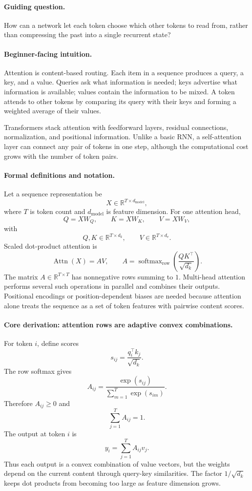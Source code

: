 \paragraph{Guiding question.}
How can a network let each token choose which other tokens to read from, rather than compressing the past into a single recurrent state?

\paragraph{Beginner-facing intuition.}
Attention is content-based routing. Each item in a sequence produces a query, a key, and a value. Queries ask what information is needed; keys advertise what information is available; values contain the information to be mixed. A token attends to other tokens by comparing its query with their keys and forming a weighted average of their values.

Transformers stack attention with feedforward layers, residual connections, normalization, and positional information. Unlike a basic RNN, a self-attention layer can connect any pair of tokens in one step, although the computational cost grows with the number of token pairs.

\paragraph{Formal definitions and notation.}
Let a sequence representation be
\[
X\in\mathbb{R}^{T\times d_{\mathrm{model}}},
\]
where \(T\) is token count and \(d_{\mathrm{model}}\) is feature dimension. For one attention head,
\[
Q=XW_Q,\qquad K=XW_K,\qquad V=XW_V,
\]
with
\[
Q,K\in\mathbb{R}^{T\times d_k},\qquad V\in\mathbb{R}^{T\times d_v}.
\]
Scaled dot-product attention is
\[
\boxed{
\operatorname{Attn}(X)
=A V,\qquad
A=\operatorname{softmax}_{\mathrm{row}}\left(\frac{QK^\top}{\sqrt{d_k}}\right).
}
\]
The matrix \(A\in\mathbb{R}^{T\times T}\) has nonnegative rows summing to \(1\). Multi-head attention performs several such operations in parallel and combines their outputs. Positional encodings or position-dependent biases are needed because attention alone treats the sequence as a set of token features with pairwise content scores.

\paragraph{Core derivation: attention rows are adaptive convex combinations.}
For token \(i\), define scores
\[
s_{ij}=\frac{q_i^\top k_j}{\sqrt{d_k}}.
\]
The row softmax gives
\[
A_{ij}=\frac{\exp(s_{ij})}{\sum_{m=1}^{T}\exp(s_{im})}.
\]
Therefore \(A_{ij}\geq0\) and
\[
\sum_{j=1}^{T}A_{ij}=1.
\]
The output at token \(i\) is
\[
y_i=\sum_{j=1}^{T}A_{ij}v_j.
\]
Thus each output is a convex combination of value vectors, but the weights depend on the current content through query-key similarities. The factor \(1/\sqrt{d_k}\) keeps dot products from becoming too large as feature dimension grows.

